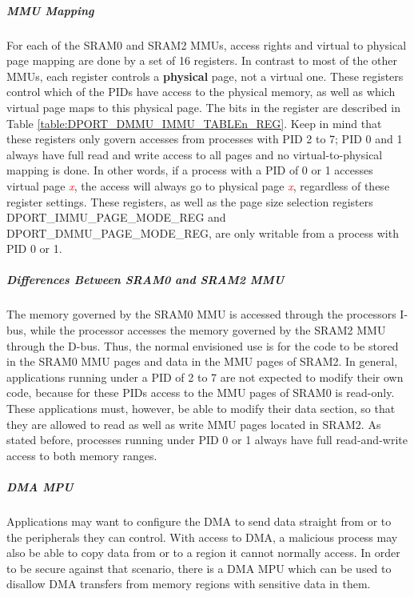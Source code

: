 

\subparagraph{MMU Mapping}

For each of the SRAM0 and SRAM2 MMUs, access rights and virtual to physical page mapping are done by a set of 16 registers. In contrast to most of the other MMUs, each register controls a \textbf{physical} page, not a virtual one. These registers control which of the PIDs have access to the physical memory, as well as which virtual page maps to this physical page. The bits in the register are described in Table \ref{table:DPORT_DMMU_IMMU_TABLEn_REG}. Keep in mind that these registers only govern accesses from processes with PID 2 to 7; PID 0 and 1 always have full read and write access to all pages and no virtual-to-physical mapping is done. In other words, if a process with a PID of 0 or 1 accesses virtual page \textcolor{red}{\it{x}}, the access will always go to physical page \textcolor{red}{\it{x}}, regardless of these register settings. These registers, as well as the page size selection registers DPORT\_IMMU\_PAGE\_MODE\_REG and DPORT\_DMMU\_PAGE\_MODE\_REG, are only writable from a process with PID 0 or 1.





\subparagraph{Differences Between SRAM0 and SRAM2 MMU}
The memory governed by the SRAM0 MMU is accessed through the processors I-bus, while the processor accesses the memory governed by the SRAM2 MMU through the D-bus. Thus, the normal envisioned use is for the code to be stored in the SRAM0 MMU pages and data in the MMU pages of SRAM2. In general, applications running under a PID of 2 to 7 are not expected to modify their own code, because for these PIDs access to the MMU pages of SRAM0 is read-only. These applications must, however, be able to modify their data section, so that they are allowed to read as well as write MMU pages located in SRAM2. As stated before, processes running under PID 0 or 1 always have full read-and-write access to both memory ranges.


\subparagraph{DMA MPU}

Applications may want to configure the DMA to send data straight from or to the peripherals they can control. With access to DMA, a malicious process may also be able to copy data from or to a region it cannot normally access. In order to be secure against that scenario, there is a DMA MPU which can be used to disallow DMA transfers from memory regions with sensitive data in them.



